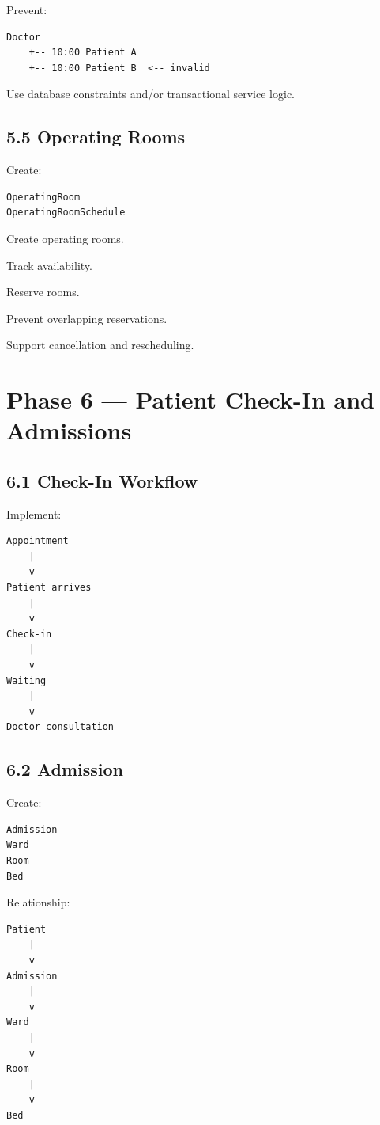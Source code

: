 \documentclass[11pt,a4paper]{article}
\newcommand{\task}[1]{\item[$\square$] #1}
\begin{document}
Prevent:

\begin{lstlisting}
Doctor
    +-- 10:00 Patient A
    +-- 10:00 Patient B  <-- invalid
\end{lstlisting}

Use database constraints and/or transactional service logic.

\subsection{5.5 Operating Rooms}

Create:

\begin{lstlisting}
OperatingRoom
OperatingRoomSchedule
\end{lstlisting}

\task{Create operating rooms.}
\task{Track availability.}
\task{Reserve rooms.}
\task{Prevent overlapping reservations.}
\task{Support cancellation and rescheduling.}

\section{Phase 6 --- Patient Check-In and Admissions}

\subsection{6.1 Check-In Workflow}

Implement:

\begin{lstlisting}
Appointment
    |
    v
Patient arrives
    |
    v
Check-in
    |
    v
Waiting
    |
    v
Doctor consultation
\end{lstlisting}

\subsection{6.2 Admission}

Create:

\begin{lstlisting}
Admission
Ward
Room
Bed
\end{lstlisting}

Relationship:

\begin{lstlisting}
Patient
    |
    v
Admission
    |
    v
Ward
    |
    v
Room
    |
    v
Bed
\end{lstlisting}
\end{document}
